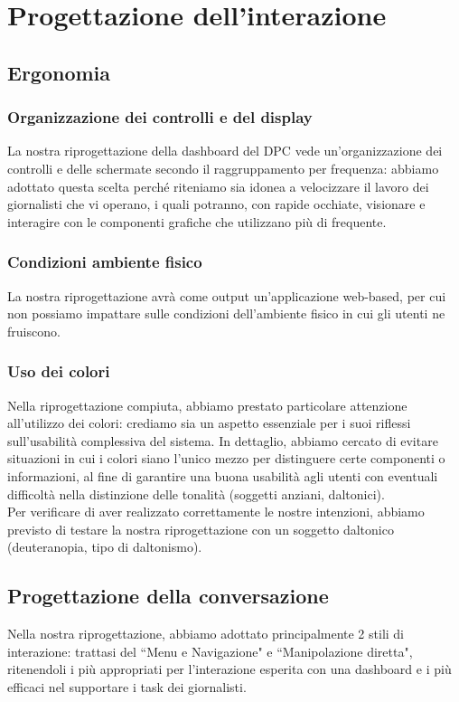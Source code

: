 \section{Progettazione dell'interazione}

\subsection{Ergonomia}

\subsubsection{Organizzazione dei controlli e del display}
La nostra riprogettazione della dashboard del DPC vede un'organizzazione dei controlli e delle schermate secondo il raggruppamento per frequenza: abbiamo adottato questa scelta perché riteniamo sia idonea a velocizzare il lavoro dei giornalisti che vi operano, i quali potranno, con rapide occhiate, visionare e interagire con le componenti grafiche che utilizzano più di frequente.

\subsubsection{Condizioni ambiente fisico}
La nostra riprogettazione avrà come output un'applicazione web-based, per cui non possiamo impattare sulle condizioni dell'ambiente fisico in cui gli utenti ne fruiscono.

\subsubsection{Uso dei colori}
Nella riprogettazione compiuta, abbiamo prestato particolare attenzione all'utilizzo dei colori: crediamo sia un aspetto essenziale per i suoi riflessi sull'usabilità complessiva del sistema. In dettaglio, abbiamo cercato di evitare situazioni in cui i colori siano l'unico mezzo per distinguere certe componenti o informazioni, al fine di garantire una buona usabilità agli utenti con eventuali difficoltà nella distinzione delle tonalità (soggetti anziani, daltonici).\\
Per verificare di aver realizzato correttamente le nostre intenzioni, abbiamo previsto di testare la nostra riprogettazione con un soggetto daltonico (deuteranopia, tipo di daltonismo).  

\subsection{Progettazione della conversazione}
Nella nostra riprogettazione, abbiamo adottato principalmente 2 stili di interazione: trattasi del ``Menu e Navigazione" e ``Manipolazione diretta", ritenendoli i più appropriati per l'interazione esperita con una dashboard e i più efficaci nel supportare i task dei giornalisti.

